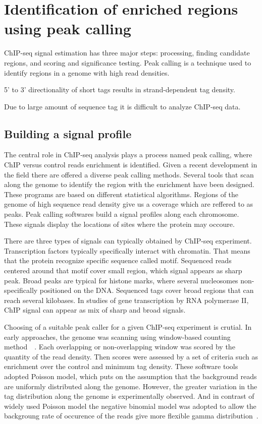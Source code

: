 \chapter{Identification of enriched regions using peak calling}

ChIP-seq signal estimation has three major steps: processing, finding candidate regions, and scoring and significance testing.
Peak calling is a technique used to identify regions in a genome with high read densities.

5' to 3' directionality of short tags results in strand-dependent tag density.

Due to large amount of sequence tag it is difficult to analyze ChIP-seq data.





\section{Building a signal profile}

The central role in ChIP-seq analysis plays a process named peak calling, where ChIP versus control reads enrichment is identified.
Given a recent development in the field there are offered a diverse peak calling methods.
Several tools that scan along the genome to identify the region with the enrichment have been designed.
These programs are based on different statistical algorithms.
Regions of the genome of high sequence read density give us a coverage which are reffered to as peaks.
Peak calling softwares build a signal profiles along each chromosome.
These signals display the locations of sites where the protein may occoure.

There are three types of signals can typically obtained by ChIP-seq experiment.
Transcription factors typically specifically interact with chromatin.
That means that the protein recognize specific sequence called motif.
Sequenced reads centered around that motif cover small region, which signal appears as sharp peak.
Broad peaks are typical for histone marks, where several nucleosomes non-specifically positioned on the DNA.
Sequenced tags cover broad regions that can reach several kilobases.
In studies of gene transcription by RNA polymerase II, ChIP signal can appear as mix of sharp and broad signals.

Choosing of a suitable peak caller for a given ChIP-seq experiment is crutial.
In early approaches, the genome was scanning using window-based counting method~\cite{Zang-2009}~\cite{Xu-2010}.
Each overlapping or non-overlapping window was scored by the quantity of the read density. 
Then scores were assessed by a set of criteria such as enrichment over the control and minimum tag density.
These software tools adopted Poisson model, which puts on the assumption that the background reads are uniformly distributed along the genome.
However, the greater variation in the tag distribution along the genome is experimentally observed.
And in contrast of widely used Poisson model the negative binomial model was adopted to allow the backgroung rate of occurence of the reads give more flexible gamma distribution~\cite{ji2008integrated}.


